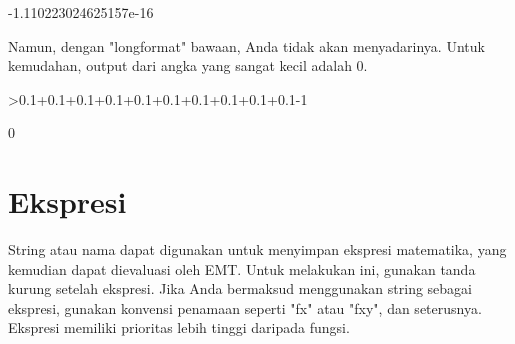 \documentclass{article}
\newenvironment{eulernotebook}{\par}{\par}
\newcommand{\eulerheading}[1]{\section{#1}}
\newenvironment{eulercomment}{\par\medskip}{\par\medskip}
\begin{document}
\begin{eulernotebook}
\begin{eulerprompt}
\end{eulerprompt}
\begin{euleroutput}
   -1.110223024625157e-16 
\end{euleroutput}
\begin{eulercomment}
Namun, dengan "longformat" bawaan, Anda tidak akan menyadarinya. Untuk
kemudahan, output dari angka yang sangat kecil adalah 0.
\end{eulercomment}
\begin{eulerprompt}
>0.1+0.1+0.1+0.1+0.1+0.1+0.1+0.1+0.1+0.1-1
\end{eulerprompt}
\begin{euleroutput}
  0
\end{euleroutput}
\eulerheading{Ekspresi}
\begin{eulercomment}
String atau nama dapat digunakan untuk menyimpan ekspresi matematika,
yang kemudian dapat dievaluasi oleh EMT. Untuk melakukan ini, gunakan
tanda kurung setelah ekspresi. Jika Anda bermaksud menggunakan string
sebagai ekspresi, gunakan konvensi penamaan seperti "fx" atau "fxy",
dan seterusnya. Ekspresi memiliki prioritas lebih tinggi daripada
fungsi.



\end{eulercomment}
\end{eulernotebook}
\end{document}
